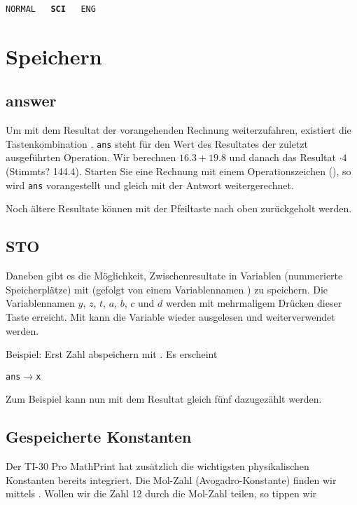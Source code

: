 \texttt{NORMAL\,\,\,\textbf{SCI}\,\,\,ENG}

\newpage


\section{Speichern}

\subsection{answer}\label{AnsSto}

Um mit dem Resultat der vorangehenden Rechnung weiterzufahren,
existiert die Tastenkombination . \texttt{ans} steht für den Wert des
Resultates der zuletzt ausgeführten Operation. Wir berechnen $16.3 +
19.8$ und danach das Resultat $\cdot4$ (Stimmts? 144.4). Starten Sie
eine Rechnung mit einem Operationszeichen (\zB {}), so
wird \texttt{ans} vorangestellt und gleich mit der Antwort weitergerechnet.

Noch ältere Resultate können mit der Pfeiltaste nach oben  zurückgeholt werden.

\subsection{STO}\label{sto}

Daneben gibt es die Möglichkeit, Zwischenresultate in Variablen (nummerierte
Speicherplätze) mit  (gefolgt von einem
Variablennamen ) zu
speichern. Die Variablennamen $y$, $z$, $t$, $a$, $b$, $c$ und $d$
werden mit mehrmaligem Drücken dieser Taste
erreicht. Mit  kann die Variable wieder 
ausgelesen und weiterverwendet werden.

Beispiel: Erst Zahl abspeichern mit  . Es
erscheint

\texttt{ans$\rightarrow{}$x}

Zum Beispiel kann nun
mit     
dem Resultat gleich fünf dazugezählt werden.

\subsection{Gespeicherte Konstanten}\label{constants}
Der TI-30 Pro MathPrint hat zusätzlich die wichtigsten physikalischen
Konstanten bereits integriert. Die Mol-Zahl (Avogadro-Konstante) \zB
finden wir mittels  . Wollen wir \zB die
Zahl 12 durch die Mol-Zahl teilen, so tippen wir

